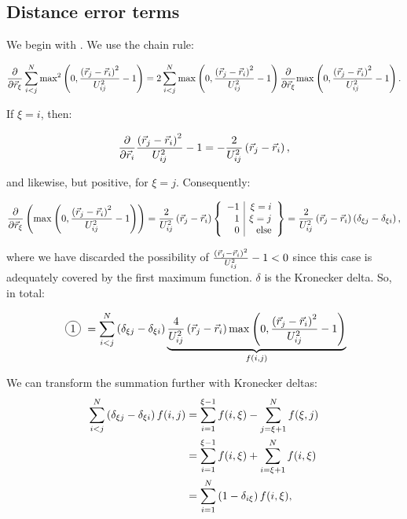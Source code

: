 \documentclass[a4paper]{article}
\newcommand*\circled[1]{
  \tikz[baseline=(char.base)]{
    \node[shape=circle,draw,inner sep=2pt] (char) {#1};
  }
}
\begin{document}
\subsection{Distance error terms}

We begin with \circled{1}. We use the chain rule:

\begin{equation}
  \frac{\partial}{\partial\vec{r}_{\xi}} \sum_{i < j}^{N} \textrm{max}^{2}\left(0, \frac{\left(\vec{r}_{j}-\vec{r}_{i}\right)^{2}}{U_{ij}^{2}}-1\right)
  = 2 \sum_{i < j}^{N} \textrm{max}^{}\left(0, \frac{\left(\vec{r}_{j}-\vec{r}_{i}\right)^{2}}{U_{ij}^{2}}-1\right) \frac{\partial}{\partial\vec{r}_{\xi}}
  \textrm{max}^{}\left(0, \frac{\left(\vec{r}_{j}-\vec{r}_{i}\right)^{2}}{U_{ij}^{2}}-1\right).
\end{equation}

If $\xi = i$, then:

\begin{equation}
  \frac{\partial}{\partial\vec{r}_{i}} \frac{\left(\vec{r}_{j}-\vec{r}_{i}\right)^{2}}{U_{ij}^{2}}-1
  = - \frac{2}{U_{ij}^{2}} \left(\vec{r}_{j}-\vec{r}_{i}\right),
\end{equation}

and likewise, but positive, for $\xi = j$. Consequently:

\begin{equation}
  \frac{\partial}{\partial\vec{r}_{\xi}} \left( \textrm{max}^{}\left(0, \frac{\left(\vec{r}_{j}-\vec{r}_{i}\right)^{2}}{U_{ij}^{2}}-1\right) \right)
  = \frac{2}{U_{ij}^{2}} \left(\vec{r}_{j}-\vec{r}_{i}\right) \left\{ \begin{array}{r | r}
    -1 & \xi = i\\
    1 & \xi = j\\
    0 & \textrm{else}
  \end{array} \right\}
  = \frac{2}{U_{ij}^{2}} \left(\vec{r}_{j}-\vec{r}_{i}\right) \left(\delta_{\xi j}-\delta_{\xi i} 
  \right),
\end{equation}

where we have discarded the possibility of $\frac{\left(\vec{r}_{j}-\vec{r}_{i}\right)^{2}}{U_{ij}^{2}}-1 < 0$
since this case is adequately covered by the first maximum function. $\delta$ is
the Kronecker delta. So, in total:

\begin{equation}\label{eq_breakdown_deltas}
  \text{\circled{1}}
  = \ijNSum \left(
    \delta_{\xi j} - \delta_{\xi i} 
  \right) \underbrace{\frac{4}{U_{ij}^{2}} 
    \posVecDiff{j}{i} \distanceErrorFirstTerm{}
  }_{f(i, j)}
\end{equation}

We can transform the summation further with Kronecker deltas:
\begin{align}
  \sum_{i < j}^{N} \left( \delta_{\xi j} - \delta_{\xi i} \right) f(i, j)
  &= \sum_{i = 1}^{\xi - 1} f(i, \xi) 
    - \sum_{j = \xi + 1}^{N} f(\xi, j)\\
  &= \sum_{i = 1}^{\xi - 1} f(i, \xi) 
    + \sum_{i = \xi + 1}^{N} f(i, \xi)\\
  &= \sum_{i = 1}^{N} \left(1 - \delta_{i\xi} \right) f(i, \xi),
\end{align}
\end{document}
